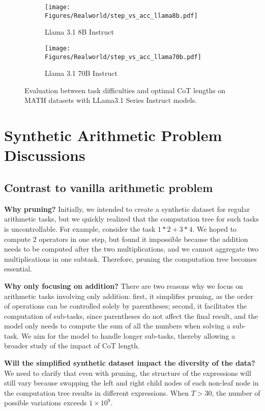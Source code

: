 \begin{figure*}[ht]
\centering

\begin{subfigure}{0.45\textwidth}
    \centering
    \texttt{[image: Figures/Realworld/step\_vs\_acc\_llama8b.pdf]}
    \caption{Llama 3.1 8B Instruct}
    \label{fig:step_vs_acc_llama8b}
\end{subfigure}%
\begin{subfigure}{0.45\textwidth}
    \centering
    \texttt{[image: Figures/Realworld/step\_vs\_acc\_llama70b.pdf]}
    \caption{Llama 3.1 70B Instruct}
    \label{fig:step_vs_acc_llama70b}
\end{subfigure}
\caption{Evaluation between task difficulties and optimal CoT lengths on MATH datasets with LLama3.1 Series Instruct models. 
}
\label{fig:llama}
\end{figure*}
\section{Synthetic Arithmetic Problem Discussions}
\label{app:task}
\subsection{Contrast to vanilla arithmetic problem}
\textbf{Why pruning?}
Initially, we intended to create a synthetic dataset for regular arithmetic tasks, but we quickly realized that the computation tree for such tasks is uncontrollable. For example, consider the task $1*2 + 3*4$. We hoped to compute $2$ operators in one step, but found it impossible because the addition needs to be computed after the two multiplications, and we cannot aggregate two multiplications in one subtask. Therefore, pruning the computation tree becomes essential.

\textbf{Why only focusing on addition?}
There are two reasons why we focus on arithmetic tasks involving only addition: first, it simplifies pruning, as the order of operations can be controlled solely by parentheses; second, it facilitates the computation of sub-tasks, since parentheses do not affect the final result, and the model only needs to compute the sum of all the numbers when solving a sub-task. We aim for the model to handle longer sub-tasks, thereby allowing a broader study of the impact of CoT length.

\textbf{Will the simplified synthetic dataset impact the diversity of the data?}
We need to clarify that even with pruning, the structure of the expressions will still vary because swapping the left and right child nodes of each non-leaf node in the computation tree results in different expressions. When $T > 30$, the number of possible variations exceeds $1 \times 10^9$.
